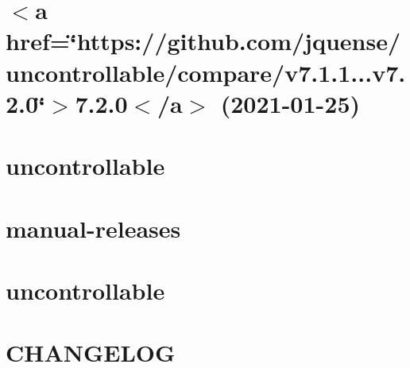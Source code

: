 \let\mypdfximage\pdfximage\def\pdfximage{\immediate\mypdfximage}\documentclass[twoside]{book}
\newcommand{\+}{\discretionary{\mbox{\scriptsize$\hookleftarrow$}}{}{}}
\begin{document}
\chapter{$<$a href=\char`\"{}https\+://github.\+com/jquense/uncontrollable/compare/v7.\+1.\+1...\+v7.\+2.\+0\char`\"{}$>$7.2.0$<$/a$>$ (2021-\/01-\/25)}
\label{md__c___users_zhart__one_drive__desktop_school_capstone_workspace_capstone_flight_risk_assesment69191326a2901969957862e6c38f5065}

\chapter{uncontrollable}
\label{md__c___users_zhart__one_drive__desktop_school_capstone_workspace_capstone_flight_risk_assesment8e1d2bccae13bcf305f4ff1438726eb3}

\chapter{manual-\/releases}
\label{md__c___users_zhart__one_drive__desktop_school_capstone_workspace_capstone_flight_risk_assesmente9129cfcb81f227b9766523d31679ae9}

\chapter{uncontrollable}
\label{md__c___users_zhart__one_drive__desktop_school_capstone_workspace_capstone_flight_risk_assesment9d3b6ef15e99e5751f59fc2b54ea9951}

\chapter{CHANGELOG}
\label{md__c___users_zhart__one_drive__desktop_school_capstone_workspace_capstone_flight_risk_assesment40565cf12ea5110da81b7c1b971c1eb5}

\end{document}
